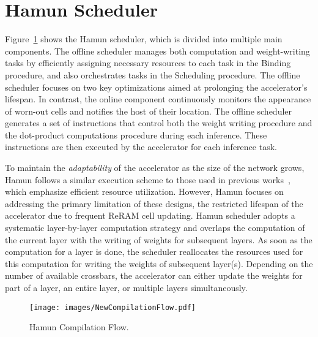 
\section{Hamun Scheduler}\label{s:Scheduler}
Figure~\ref{fig:Compilation} shows the Hamun scheduler, which is divided into multiple main components. The offline scheduler manages both computation and weight-writing tasks by efficiently assigning necessary resources to each task in the Binding procedure, and also orchestrates tasks in the Scheduling procedure. The offline scheduler focuses on two key optimizations aimed at prolonging the accelerator’s lifespan. In contrast, the online component continuously monitors the appearance of worn-out cells and notifies the host of their location. The offline scheduler generates a set of instructions that control both the weight writing procedure and the dot-product computations procedure during each inference. These instructions are then executed by the accelerator for each inference task.

To maintain the \textit{adaptability} of the accelerator as the size of the network grows, Hamun follows a similar execution scheme to those used in previous works~\cite{ARAS, MNEMOSENE}, which emphasize efficient resource utilization. However, Hamun focuses on addressing the primary limitation of these designs, the restricted lifespan of the accelerator due to frequent ReRAM cell updating. Hamun scheduler adopts a systematic layer-by-layer computation strategy and overlaps the computation of the current layer with the writing of weights for subsequent layers. As soon as the computation for a layer is done, the scheduler reallocates the resources used for this computation for writing the weights of subsequent layer(s). Depending on the number of available crossbars, the accelerator can either update the weights for part of a layer, an entire layer, or multiple layers simultaneously.


\begin{figure}[t!]
    \centering
    \texttt{[image: images/NewCompilationFlow.pdf]}
    \vskip -0.10in
    \caption{Hamun Compilation Flow.}
    \label{fig:Compilation}
    \vskip -0.25in
\end{figure}

